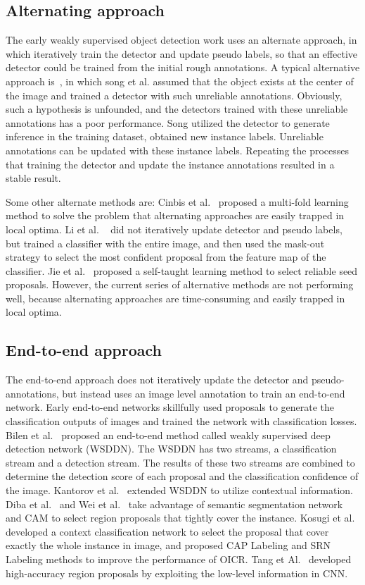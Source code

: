 \documentclass[final,3p,times,twocolumn]{elsarticle}
\begin{document}
\subsection{Alternating approach}
The early weakly supervised object detection work uses an alternate approach, in which iteratively train the detector and update pseudo labels, so that an effective detector could be trained from the initial rough annotations. A typical alternative approach is~\cite{Song2014On}, in which song et al. assumed that the object exists at the center of the image and trained a detector with such unreliable annotations. Obviously, such a hypothesis is unfounded, and the detectors trained with these unreliable annotations has a poor performance. Song utilized the detector to generate inference in the training dataset, obtained new instance labels. Unreliable annotations can be updated with these instance labels. Repeating the processes that training the detector and update the instance annotations resulted in a stable result.

Some other alternate methods are: Cinbis et al.~\cite{cinbis2016weakly} proposed a multi-fold learning method to solve the problem that alternating approaches are easily trapped in local optima. Li et al. ~\cite{li2016weakly} did not iteratively update detector and pseudo labels, but trained a classifier with the entire image, and then used the mask-out strategy to select the most confident proposal from the feature map of the classifier. Jie et al.~\cite{jie2017deep} proposed a self-taught learning method to select reliable seed proposals. However, the current series of alternative methods are not performing well, because alternating approaches are time-consuming and easily trapped in local optima.

\subsection{End-to-end approach}
The end-to-end approach does not iteratively update the detector and pseudo-annotations, but instead uses an image level annotation to train an end-to-end network. Early end-to-end networks skillfully used proposals to generate the classification outputs of images and trained the network with classification losses. Bilen et al.~\cite{bilen2016weakly} proposed an end-to-end method called weakly supervised deep detection network (WSDDN). The WSDDN has two streams, a classification stream and a detection stream. The results of these two streams are combined to determine the detection score of each proposal and the classification confidence of the image. Kantorov et al.~\cite{kantorov2016contextlocnet} extended WSDDN to utilize contextual information. Diba et al.~\cite{diba2017weakly} and Wei et al.~\cite{wei2018ts2c} take advantage of semantic segmentation network and CAM\cite{zhou2016learning} to select region proposals that tightly cover the instance. Kosugi et al.~\cite{kosugi2019object} developed a context classification network to select the proposal that cover exactly the whole instance in image, and proposed CAP Labeling and SRN Labeling methods to improve the performance of OICR. Tang et Al.~\cite{tang2018weakly} developed high-accuracy region proposals by exploiting the low-level information in CNN.
\end{document}
